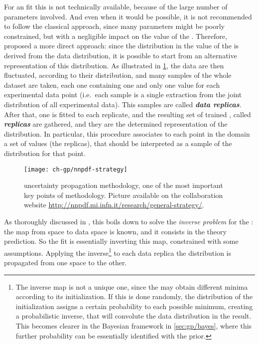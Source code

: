 For an \nn fit this is not technically available, because of the large number
of parameters involved. And even when it would be possible, it is not
recommended to follow the classical approach, since many parameters might be
poorly constrained, but with a negligible impact on the value of the \pdfs.
%
Therefore, \nnpdf proposed a more direct approach: since the distribution in
the value of the \pdf is derived from the data distribution, it is possible to
start from an alternative representation of this distribution.
%
As illustrated in \cref{fig:gp/nnpdf}, the data are then fluctuated, according
to their distribution, and many samples of the whole dataset are taken, each
one containing one and only one value for each experimental data point (i.e.\
each sample is a single extraction from the joint distribution of all
experimental data).
%
This samples are called \textbf{\textit{data replicas}}.
%
After that, one \nn is fitted to each replicate, and the resulting set of
trained \acrshortpl{nn}, called \textbf{\textit{\nn replicas}} are gathered,
and they are the determined \mc representation of the \pdfs distribution.
%
In particular, this procedure associates to each point in the \pdfs domain a
set of values (the \nn replicas), that should be interpreted as a sample of the
\pdfs distribution for that point.

\begin{figure}
	\centering
	\texttt{[image: ch-gp/nnpdf-strategy]}
	\caption{
    \nnpdf uncertainty propagation methodology, one of the most important key
    points of \nnpdf methodology.
    Picture available on the collaboration website
    \url{http://nnpdf.mi.infn.it/research/general-strategy/}.
	}
	\label{fig:gp/nnpdf}
\end{figure}

As thoroughly discussed in \cite{DelDebbio:2021whr}, this boils down to solve
the \textit{inverse problem} for the \pdfs: the map from \pdf space to data
space is known, and it consists in the theory prediction. So the fit is
essentially inverting this map, constrained with some assumptions.
%
Applying the inverse\footnote{
  The inverse map is not a unique one, since the \nn may obtain different
  minima according to its initialization.
  If this is done randomly, the distribution of the initialization assigns a
  certain probability to each possible minimum, creating a probabilistic
  inverse, that will convolute the data distribution in the result.
  This becomes clearer in the Bayesian framework in \cref{sec:gp/bayes}, where
  this further probability can be essentially identified with the prior. 
} to each data replica the distribution is propagated from one space to the
other.

